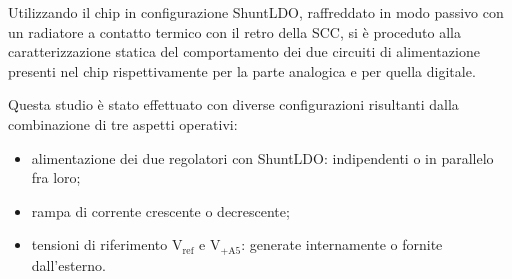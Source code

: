 Utilizzando il chip in configurazione ShuntLDO, raffreddato in modo passivo con un radiatore a contatto termico con il retro della SCC, si è proceduto alla caratterizzazione statica del comportamento dei due circuiti di alimentazione presenti nel chip rispettivamente per la parte analogica e per quella digitale. 

Questa studio è stato effettuato con diverse configurazioni risultanti dalla combinazione di tre aspetti operativi:
\begin{itemize}
  \item alimentazione dei due regolatori con ShuntLDO: indipendenti o in parallelo fra loro;
  \item rampa di corrente crescente o decrescente;
  \item tensioni di riferimento $\mathrm{V_{ref}}$ e $\mathrm{V_{+A5}}$: generate internamente o fornite dall'esterno.
\end{itemize}

